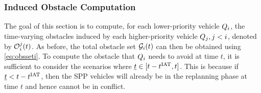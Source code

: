 %

\subsubsection{Induced Obstacle Computation} \label{sec:intruder_iocomp}
The goal of this section is to compute, for each lower-priority vehicle $Q_i$, the time-varying obstacles induced by each higher-priority vehicle $Q_j, j < i$, denoted by $\mathcal{O}_i^j(t)$. As before, the total obstacle set $\mathcal{G}_i(t)$ can then be obtained using \eqref{eq:obsseti}. To compute the obstacle that $Q_i$ needs to avoid at time $t$, it is sufficient to consider the scenarios where $\underline{t} \in [t-t^\text{IAT}, t]$. This is because if $\underline{t} < t - t^\text{IAT}$, then the SPP vehicles will already be in the replanning phase at time $t$ and hence cannot be in conflict. 

